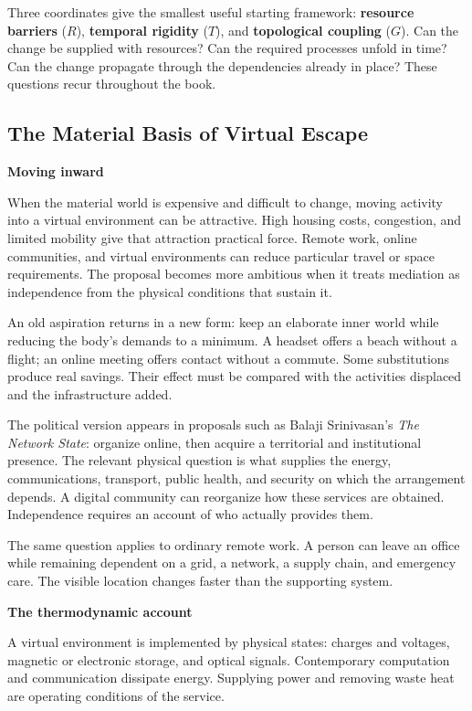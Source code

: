 \documentclass[11pt,openany]{book}
\newcommand{\term}[1]{\textbf{#1}}
\newcommand{\subhead}[1]{\par\medskip\noindent\textbf{#1}\par\nobreak\smallskip}
\begin{document}
Three coordinates give the smallest useful starting framework: \term{resource barriers} ($R$), \term{temporal rigidity} ($T$), and \term{topological coupling} ($G$). Can the change be supplied with resources? Can the required processes unfold in time? Can the change propagate through the dependencies already in place? These questions recur throughout the book.

\subsection{The Material Basis of Virtual Escape}

\subhead{Moving inward}

When the material world is expensive and difficult to change, moving activity into a virtual environment can be attractive. High housing costs, congestion, and limited mobility give that attraction practical force. Remote work, online communities, and virtual environments can reduce particular travel or space requirements. The proposal becomes more ambitious when it treats mediation as independence from the physical conditions that sustain it.

An old aspiration returns in a new form: keep an elaborate inner world while reducing the body's demands to a minimum. A headset offers a beach without a flight; an online meeting offers contact without a commute. Some substitutions produce real savings. Their effect must be compared with the activities displaced and the infrastructure added.

The political version appears in proposals such as Balaji Srinivasan's \emph{The Network State}: organize online, then acquire a territorial and institutional presence. The relevant physical question is what supplies the energy, communications, transport, public health, and security on which the arrangement depends. A digital community can reorganize how these services are obtained. Independence requires an account of who actually provides them.

The same question applies to ordinary remote work. A person can leave an office while remaining dependent on a grid, a network, a supply chain, and emergency care. The visible location changes faster than the supporting system.

\subhead{The thermodynamic account}

A virtual environment is implemented by physical states: charges and voltages, magnetic or electronic storage, and optical signals. Contemporary computation and communication dissipate energy. Supplying power and removing waste heat are operating conditions of the service.
\end{document}
